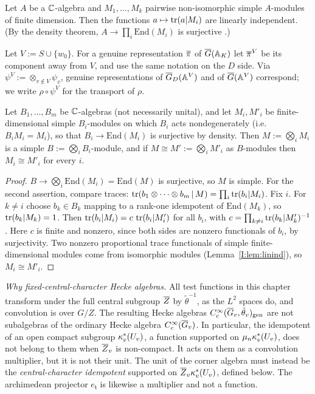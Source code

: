 \begin{lemma}\label{I:lem:linind}\Ev
Let $A$ be a $\mathbb{C}$-algebra and $M_1,\dots,M_k$ pairwise non-isomorphic simple $A$-modules of finite dimension. Then the functions $a\mapsto\operatorname{tr}(a|M_i)$ are linearly independent. (By the density theorem, $A\to\prod_i\mathrm{End}(M_i)$ is surjective \cite[XVII]{Lan02}.)
\end{lemma}

Let $V:=S\cup\{w_0\}$. For a genuine representation $\overline{\pi}$ of $\overline{G}(\mathbb{A}_K)$ let $\overline{\pi}^V$ be its component away from $V$, and use the same notation on the $D$ side. Via $\psi^V:=\otimes_{v\notin V}\psi_v$, genuine representations of $\overline{G}_D(\mathbb{A}^V)$ and of $\overline{G}(\mathbb{A}^V)$ correspond; we write $\rho\circ\psi^V$ for the transport of $\rho$.

\begin{lemma}\label{I:lem:tensor}
Let $B_1,\dots,B_m$ be $\mathbb{C}$-algebras (not necessarily unital), and let $M_i,M'_i$ be finite-dimensional simple $B_i$-modules on which $B_i$ acts nondegenerately (i.e.\ $B_iM_i=M_i$), so that $B_i\to\mathrm{End}(M_i)$ is surjective by density. Then $M:=\bigotimes_iM_i$ is a simple $B:=\bigotimes_iB_i$-module, and if $M\cong M':=\bigotimes_iM'_i$ as $B$-modules then $M_i\cong M'_i$ for every $i$.
\end{lemma}
\begin{proof}
$B\to\bigotimes_i\mathrm{End}(M_i)=\mathrm{End}(M)$ is surjective, so $M$ is simple. For the second assertion, compare traces: $\operatorname{tr}(b_1\otimes\cdots\otimes b_m\,|\,M)=\prod_i\operatorname{tr}(b_i|M_i)$. Fix $i$. For $k\neq i$ choose $b_k\in B_k$ mapping to a rank-one idempotent of $\mathrm{End}(M_k)$, so $\operatorname{tr}(b_k|M_k)=1$. Then $\operatorname{tr}(b_i|M_i)=c\,\operatorname{tr}(b_i|M'_i)$ for all $b_i$, with $c=\prod_{k\ne i}\operatorname{tr}(b_k|M'_k)^{-1}$. Here $c$ is finite and nonzero, since both sides are nonzero functionals of $b_i$, by surjectivity. Two nonzero proportional trace functionals of simple finite-dimensional modules come from isomorphic modules (Lemma~\ref{I:lem:linind}), so $M_i\cong M'_i$.
\end{proof}

\emph{Why fixed-central-character Hecke algebras.} All test functions in this chapter transform under the full central subgroup $\overline{Z}$ by $\tilde\theta^{-1}$, as the $L^2$ spaces do, and convolution is over $G/Z$. The resulting Hecke algebras $C_c^\infty(\overline{G}_v,\tilde\theta_v)_{\mathrm{gen}}$ are not subalgebras of the ordinary Hecke algebra $C_c^\infty(\overline{G}_v)$. In particular, the idempotent of an open compact subgroup $\kappa^{*}_v(U_v)$, a function supported on $\mu_n\kappa^{*}_v(U_v)$, does not belong to them when $\overline{Z}_v$ is non-compact. It acts on them as a convolution multiplier, but it is not their unit. The unit of the corner algebra must instead be the \emph{central-character idempotent} supported on $\overline{Z}_v\kappa^{*}_v(U_v)$, defined below. The archimedean projector $e_{\mathfrak t}$ is likewise a multiplier and not a function.

